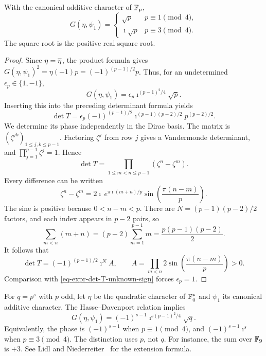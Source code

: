 \begin{prop}
\label{prop-sign-are-gauss}
With the canonical additive character of $\mathbb{F}_p$,
\[
 G(\eta,\psi_1)=\begin{cases}\sqrt p&p\equiv1\pmod4,\\
 \imath\sqrt p&p\equiv3\pmod4.
 \end{cases}
\]
The square root is the positive real square root.
\end{prop}
\begin{proof}
Since $\eta=\overline{\eta}$, the product formula gives
$G(\eta,\psi_1)^2=\eta(-1)p=(-1)^{(p-1)/2}p$.
Thus, for an undetermined $\epsilon_p\in\{1,-1\}$,
\[
 G(\eta,\psi_1)=\epsilon_p\imath^{(p-1)^2/4}\sqrt p.
\]
Inserting this into the preceding determinant formula yields
\begin{equation}
\label{eq-expr-det-T-unknown-sign}
 \det T=\epsilon_p(-1)^{(p-1)/2}
        \imath^{(p-1)(p-2)/2}p^{(p-2)/2}.
\end{equation}
We determine its phase independently in the Dirac basis. The matrix is
$(\zeta^{jk})_{1\leq j,k\leq p-1}$. Factoring $\zeta^j$ from row $j$ gives
a Vandermonde determinant, and $\prod_{j=1}^{p-1}\zeta^j=1$. Hence
\[
 \det T=\prod_{1\leq m<n\leq p-1}(\zeta^n-\zeta^m).
\]
Every difference can be written
\[
 \zeta^n-\zeta^m
 =2\imath\,e^{\pi\imath(m+n)/p}
   \sin\!\left(\frac{\pi(n-m)}p\right).
\]
The sine is positive because $0<n-m<p$. There are
$N=(p-1)(p-2)/2$ factors, and each index appears in $p-2$ pairs, so
\[
 \sum_{m<n}(m+n)=(p-2)\sum_{m=1}^{p-1}m
 =\frac{p(p-1)(p-2)}2.
\]
It follows that
\[
 \det T=(-1)^{(p-1)/2}\imath^N A,\qquad
 A=\prod_{m<n}2\sin\!\left(\frac{\pi(n-m)}p\right)>0.
\]
Comparison with \eqref{eq-expr-det-T-unknown-sign} forces $\epsilon_p=1$.
\end{proof}


\begin{rem}
For $q=p^s$ with $p$ odd, let $\eta$ be the quadratic character of $\mathbb{F}_q^*$
and $\psi_1$ its canonical additive character. The Hasse--Davenport relation
implies
\[
 G(\eta,\psi_1)=(-1)^{s-1}\imath^{s(p-1)^2/4}\sqrt q.
\]
Equivalently, the phase is $(-1)^{s-1}$ when $p\equiv1\pmod4$, and
$(-1)^{s-1}\imath^s$ when $p\equiv3\pmod4$.
The distinction uses $p$, not $q$. For instance, the sum over $\mathbb{F}_9$ is
$+3$. See Lidl and Niederreiter~\cite{lidl} for the extension formula.
\end{rem}

